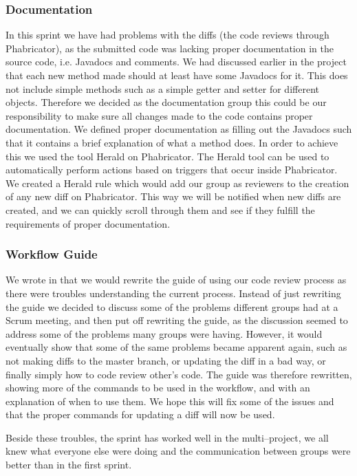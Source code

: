 \subsubsection{Documentation}
In this sprint we have had problems with the diffs (the code reviews through Phabricator), as the submitted code was lacking proper documentation in the source code, i.e. Javadocs and comments.
We had discussed earlier in the project that each new method made should at least have some Javadocs for it.
This does not include simple methods such as a simple getter and setter for different objects.
Therefore we decided as the documentation group this could be our responsibility to make sure all changes made to the code contains proper documentation.
We defined proper documentation as filling out the Javadocs such that it contains a brief explanation of what a method does.
In order to achieve this we used the tool Herald on Phabricator.
The Herald tool can be used to automatically perform actions based on triggers that occur inside Phabricator.
We created a Herald rule which would add our group as reviewers to the creation of any new diff on Phabricator.
This way we will be notified when new diffs are created, and we can quickly scroll through them and see if they fulfill the requirements of proper documentation.

\subsubsection{Workflow Guide}
We wrote in  that we would rewrite the guide of using our code review process as there were troubles understanding the current process.
Instead of just rewriting the guide we decided to discuss some of the problems different groups had at a Scrum meeting, and then put off rewriting the guide, as the discussion seemed to address some of the problems many groups were having.
However, it would eventually show that some of the same problems became apparent again, such as not making diffs to the master branch, or updating the diff in a bad way, or finally simply how to code review other's code.
The guide was therefore rewritten, showing more of the commands to be used in the workflow, and with an explanation of when to use them.
We hope this will fix some of the issues and that the proper commands for updating a diff will now be used.

Beside these troubles, the sprint has worked well in the multi--project, we all knew what everyone else were doing and the communication between groups were better than in the first sprint.

